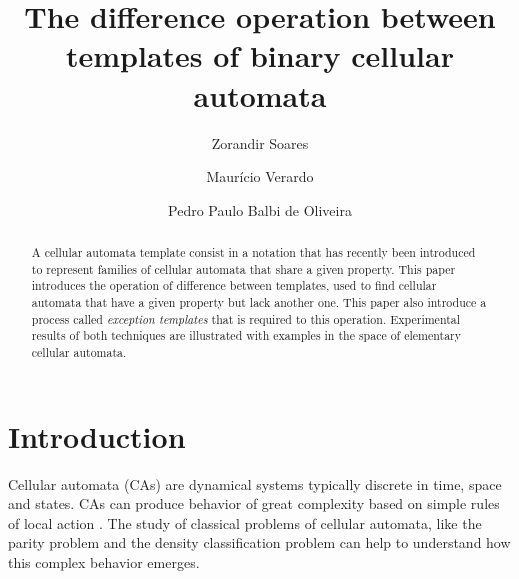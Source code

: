 \documentclass{llncs}
\begin{document}
\pagestyle{headings}  %

\title{The difference operation between templates of binary cellular automata}


\author{Zorandir Soares \and Maurício Verardo \and
Pedro Paulo Balbi de Oliveira}




\maketitle              %

\begin{abstract}
A cellular automata template consist in a notation that has recently been introduced to represent families of cellular automata that share a given property. This paper introduces the operation of difference between templates, used to find cellular automata that have a given property but lack another one. This paper also introduce a process called \textit{exception templates} that is required to this operation. Experimental results of both techniques are illustrated with examples in the space of elementary cellular automata.
\end{abstract}
%
\section{Introduction}
\label{sec:introducao}
Cellular automata (CAs) are dynamical systems typically discrete in time, space and states.
CAs can produce behavior of great complexity based on simple rules of local action \cite{wolfram2002}. The study of classical problems of cellular automata, like the parity problem \cite{Betel2013} and the density classification problem \cite{deOliveira2014density} can help to understand how this complex behavior emerges.
\end{document}
